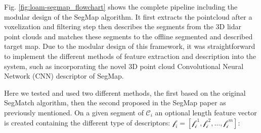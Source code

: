 \documentclass[letterpaper, 10 pt, conference]{ieeeconf}  %
\begin{document}
Fig. \ref{fig:loam-segmap_flowchart} shows the complete pipeline including the modular design of the SegMap algorithm. It first extracts the pointcloud after a voxelization and filtering step then describes the segments from the 3D lidar point clouds and matches these segments to the offline segmented and described target map. Due to the modular design of this framework, it was straightforward to implement the different methods of feature extraction and description into the system, such as incorporating the novel 3D point cloud Convolutional Neural Network (CNN) descriptor of SegMap.


Here we tested and used two different methods, the first based on the original SegMatch algorithm, then the second proposed in the SegMap paper as previously mentioned. 
On a given segment of $\mathcal{C}_i$ an optional length feature vector is created containing the different type of descriptors: $\mathscr{f}_i=[\mathscr{f_i}^1, \mathscr{f_i}^2, \dots, \mathscr{f_i}^m]$:
\end{document}
